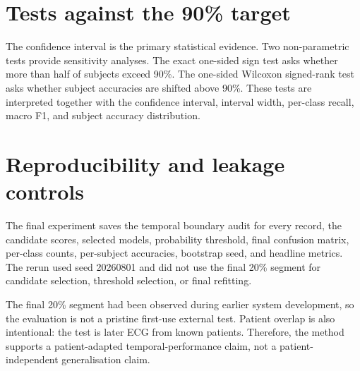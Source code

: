 \section{Tests against the 90\% target}

The confidence interval is the primary statistical evidence. Two
non-parametric tests provide sensitivity analyses. The exact one-sided sign
test asks whether more than half of subjects exceed 90\%. The one-sided
Wilcoxon signed-rank test asks whether subject accuracies are shifted above
90\%. These tests are interpreted together with the confidence interval,
interval width, per-class recall, macro F1, and subject accuracy distribution.

\section{Reproducibility and leakage controls}

The final experiment saves the temporal boundary audit for every record, the
candidate scores, selected models, probability threshold, final confusion
matrix, per-class counts, per-subject accuracies, bootstrap seed, and headline
metrics. The rerun used seed 20260801 and did not use the final 20\% segment
for candidate selection, threshold selection, or final refitting.

The final 20\% segment had been observed during earlier system development, so
the evaluation is not a pristine first-use external test. Patient overlap is
also intentional: the test is later ECG from known patients. Therefore, the
method supports a patient-adapted temporal-performance claim, not a
patient-independent generalisation claim.
